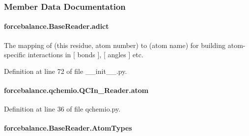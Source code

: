 \subsubsection{Member Data Documentation}
\hypertarget{classforcebalance_1_1BaseReader_a2c46ad6b66cf09a30e917ce4a1997e2a}{
\paragraph[{adict}]{\setlength{\rightskip}{0pt plus 5cm}forcebalance.\-Base\-Reader.\-adict\hspace{0.3cm}{\ttfamily [inherited]}}}\label{classforcebalance_1_1BaseReader_a2c46ad6b66cf09a30e917ce4a1997e2a}


The mapping of (this residue, atom number) to (atom name) for building atom-\/specific interactions in \mbox{[} bonds \mbox{]}, \mbox{[} angles \mbox{]} etc. 



Definition at line 72 of file \-\_\-\-\_\-init\-\_\-\-\_\-.\-py.

\hypertarget{classforcebalance_1_1qchemio_1_1QCIn__Reader_a292faa93e52c57c63d3c34d1bb9d5012}{
\paragraph[{atom}]{\setlength{\rightskip}{0pt plus 5cm}forcebalance.\-qchemio.\-Q\-C\-In\-\_\-\-Reader.\-atom}}\label{classforcebalance_1_1qchemio_1_1QCIn__Reader_a292faa93e52c57c63d3c34d1bb9d5012}


Definition at line 36 of file qchemio.\-py.

\hypertarget{classforcebalance_1_1BaseReader_a69ca7d949a4a3df4d9f61e617fe0e270}{
\paragraph[{Atom\-Types}]{\setlength{\rightskip}{0pt plus 5cm}forcebalance.\-Base\-Reader.\-Atom\-Types\hspace{0.3cm}{\ttfamily [inherited]}}}\label{classforcebalance_1_1BaseReader_a69ca7d949a4a3df4d9f61e617fe0e270}


